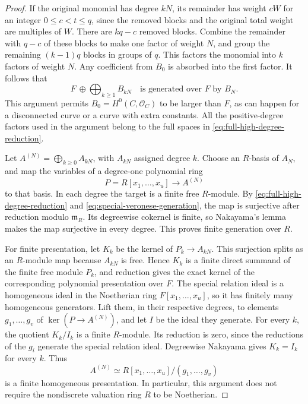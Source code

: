 \begin{proof}
If the original monomial has degree $kN$, its remainder has weight
$cW$ for an integer $0\leq c<t\leq q$, since the removed blocks
and the original total weight are multiples of $W$. There are
$kq-c$ removed blocks. Combine the remainder with $q-c$ of these
blocks to make one factor of weight $N$, and group the remaining
$(k-1)q$ blocks in groups of $q$. This factors the monomial into
$k$ factors of weight $N$. Any coefficient from $B_0$ is absorbed
into the first factor. It follows that
\begin{equation}\label{eq:special-veronese-generation}
 F\ \oplus\!\bigoplus_{k\geq1} B_{kN}
 \quad\text{is generated over $F$ by }B_N.
\end{equation}
This argument permits $B_0=H^0(C,\mathcal O_C)$ to be larger than
$F$, as can happen for a disconnected curve or a curve with extra
constants. All the positive-degree factors used in the argument
belong to the full spaces in \eqref{eq:full-high-degree-reduction}.

Let $A^{(N)}=\bigoplus_{k\geq0}A_{kN}$, with $A_{kN}$ assigned degree
$k$. Choose an $R$-basis of $A_N$, and map the variables of a
degree-one polynomial ring
\[
 P=R[x_1,\ldots,x_u]\longrightarrow A^{(N)}
\]
to that basis. In each degree the target is a finite free $R$-module.
By \eqref{eq:full-high-degree-reduction} and
\eqref{eq:special-veronese-generation}, the map is surjective after
reduction modulo $\mathfrak m_R$. Its degreewise cokernel is finite,
so Nakayama's lemma makes the map surjective in every degree.
This proves finite generation over $R$.

For finite presentation, let $K_k$ be the kernel of
$P_k\to A_{kN}$. This surjection splits as an $R$-module map because
$A_{kN}$ is free. Hence $K_k$ is a finite direct summand of the finite
free module $P_k$, and reduction gives the exact kernel of the
corresponding polynomial presentation over $F$. The special relation
ideal is a homogeneous ideal in the Noetherian ring
$F[x_1,\ldots,x_u]$, so it has finitely many homogeneous generators.
Lift them, in their respective degrees, to elements $g_1,\ldots,g_v$
of $\ker(P\to A^{(N)})$, and let $I$ be the ideal they generate.
For every $k$, the quotient $K_k/I_k$ is a finite $R$-module. Its
reduction is zero, since the reductions of the $g_i$ generate the
special relation ideal. Degreewise Nakayama gives $K_k=I_k$ for every
$k$. Thus
\[
 A^{(N)}\simeq R[x_1,\ldots,x_u]/(g_1,\ldots,g_v)
\]
is a finite homogeneous presentation. In particular, this argument
does not require the nondiscrete valuation ring $R$ to be Noetherian.


\end{proof}
